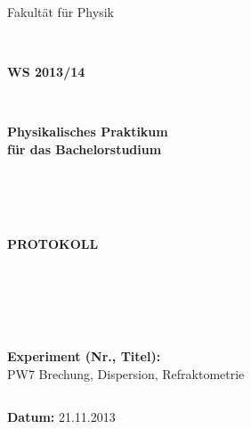\documentclass[12pt,a4paper]{article}
\begin{document}
%
%

%




\thispagestyle{empty}
			\begin{center}
			\Large{Fakultät für Physik}\\
			\end{center}
\begin{verbatim}


\end{verbatim}
			\begin{center}
			\textbf{\LARGE WS 2013/14}
			\end{center}
\begin{verbatim}


\end{verbatim}
			\begin{center}
			\textbf{\LARGE{Physikalisches Praktikum\\ für das Bachelorstudium}}
			\end{center}
\begin{verbatim}




\end{verbatim}

			\begin{center}
			\textbf{\LARGE{PROTOKOLL}}
			\end{center}
			
\begin{verbatim}





\end{verbatim}

			\begin{flushleft}
			\textbf{\Large{Experiment (Nr., Titel):}}\\
			\LARGE{PW7 Brechung, Dispersion, Refraktometrie}	
			\end{flushleft}

\begin{verbatim}

\end{verbatim}	
			\begin{flushleft}
			\textbf{\Large{Datum:}} \Large{21.11.2013}
			\end{flushleft}
			
\end{document}
